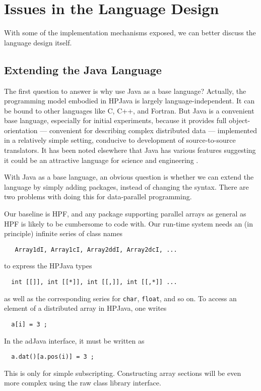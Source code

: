 \section{Issues in the Language Design}
\label{sec:design}

With some of the implementation mechanisms exposed, we can
better discuss the language design itself.

\subsection{Extending the Java Language}

The first question to answer is why use Java as a base language?
Actually, the programming model embodied in HPJava is largely language-independent.  
It can be bound to other languages like C, C++, and Fortran.
But Java is a convenient base language, especially for initial
experiments, because it provides full object-orientation --- convenient
for describing complex distributed data --- implemented in a relatively
simple setting, conducive to development of source-to-source
translators.  It has been noted elsewhere that Java has various
features suggesting it could be an attractive language for science
and engineering \cite{Java98}.

With Java as a base language, an obvious question is whether we can
extend the language by simply adding packages, instead of changing the
syntax.  There are two problems with doing this for data-parallel
programming.

Our baseline is HPF, and any package supporting parallel arrays as
general as HPF is likely to be cumbersome to code with.  Our run-time
system needs an (in principle) infinite series of class names
\begin{small}
\begin{verbatim}
   Array1dI, Array1cI, Array2ddI, Array2dcI, ...
\end{verbatim}
\end{small}
to express the HPJava types
\begin{small}
\begin{verbatim}
  int [[]], int [[*]], int [[,]], int [[,*]] ... 
\end{verbatim}
\end{small}
as well as the corresponding series for \texttt{char}, \texttt{float}, and so on.
To access an element of a distributed array in HPJava, one writes
\begin{small}
\begin{verbatim}
  a[i] = 3 ;
\end{verbatim}
\end{small}
In the adJava interface, it must be written as
\begin{small}
\begin{verbatim}
  a.dat()[a.pos(i)] = 3 ;
\end{verbatim}
\end{small}
This is only for simple subscripting. Constructing array
sections will be even more complex using the raw class library
interface.

